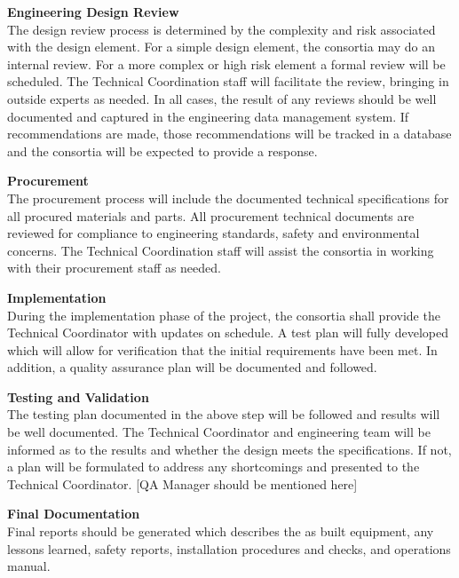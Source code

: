 {\bf Engineering Design Review}\\
The design review process is determined by the complexity and risk
associated with the design element.  For a simple design element, the
consortia may do an internal review.  For a more complex or high risk
element a formal review will be scheduled.  The  Technical
Coordination staff will facilitate the review, bringing in outside
experts as needed.  In all cases, the result of any reviews should be
well documented and captured in the engineering data management
system.  If recommendations are made, those recommendations will be
tracked in a database and the consortia will be expected to provide a
response.

{\bf Procurement}\\ The procurement process will include the
documented technical specifications for all procured materials and
parts.  All procurement technical documents are reviewed for
compliance to engineering standards, safety and environmental
concerns.  The  Technical Coordination staff will assist the
consortia in working with their procurement staff as needed.

{\bf Implementation}\\ During the implementation phase of the project,
the consortia shall provide the Technical Coordinator with updates on
schedule.  A test plan will fully developed which will allow for
verification that the initial requirements have been met. In addition,
a quality assurance plan will be documented and followed.

{\bf Testing and Validation\\}
The testing plan documented in the above step will be followed and
results will be well documented.  The Technical Coordinator and
engineering team will be informed as to the results and whether the
design meets the specifications.  If not, a plan will be formulated
to address any shortcomings and presented to the Technical
Coordinator. [QA Manager should be mentioned here]

{\bf Final Documentation\\}
Final reports should be generated which describes the as built
equipment, any lessons learned, safety reports, installation procedures
and checks, and operations manual.
